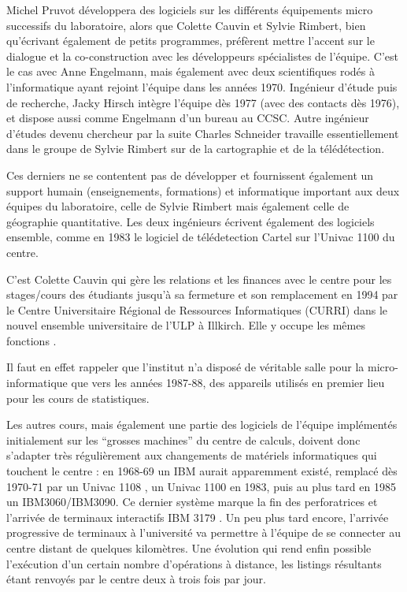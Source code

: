 Michel Pruvot développera des logiciels sur les différents équipements micro successifs du laboratoire, alors que Colette Cauvin et Sylvie Rimbert, bien qu'écrivant également de petits programmes, préfèrent mettre l'accent sur le dialogue et la co-construction avec les développeurs spécialistes de l'équipe. C'est le cas avec Anne Engelmann, mais également avec deux scientifiques rodés à l'informatique ayant rejoint l'équipe dans les années 1970. Ingénieur d'étude puis de recherche, Jacky Hirsch intègre l'équipe dès 1977 (avec des contacts dès 1976), et dispose aussi comme Engelmann d'un bureau au CCSC. Autre ingénieur d'études devenu chercheur par la suite Charles Schneider travaille essentiellement dans le groupe de Sylvie Rimbert sur de la cartographie et de la télédétection.

Ces derniers ne se contentent pas de développer et fournissent également un support humain (enseignements, formations) et informatique important aux deux équipes du laboratoire, celle de Sylvie Rimbert mais également celle de géographie quantitative. Les deux ingénieurs écrivent également des logiciels ensemble, comme en 1983 le logiciel de télédetection Cartel sur l'Univac 1100 du centre.

C'est Colette Cauvin qui gère les relations et les finances avec le centre pour les stages/cours des étudiants jusqu'à sa fermeture et son remplacement en 1994 par le Centre Universitaire Régional de Ressources Informatiques (CURRI) dans le nouvel ensemble universitaire de l'ULP à Illkirch. Elle y occupe les mêmes fonctions .

Il faut en effet rappeler que l'institut n'a disposé de véritable salle pour la micro-informatique que vers les années 1987-88, des appareils utilisés en premier lieu pour les cours de statistiques.

Les autres cours, mais également une partie des logiciels de l'équipe implémentés initialement sur les \enquote{grosses machines} du centre de calculs, doivent donc s'adapter très régulièrement aux changements de matériels informatiques qui touchent le centre : en 1968-69 un IBM aurait apparemment existé, remplacé dès 1970-71 par un Univac 1108 \autocite{Dalmasso1971}, un Univac 1100 en 1983, puis au plus tard en 1985 un IBM3060/IBM3090. Ce dernier système marque la fin des perforatrices et l'arrivée de terminaux interactifs IBM 3179 \autocites{Rimbert1984,Cauvin1986}. Un peu plus tard encore, l'arrivée progressive de terminaux à l'université va permettre à l'équipe de se connecter au centre distant de quelques kilomètres. Une évolution qui rend enfin possible l'exécution d'un certain nombre d'opérations à distance, les listings résultants étant renvoyés par le centre deux à trois fois par jour.

